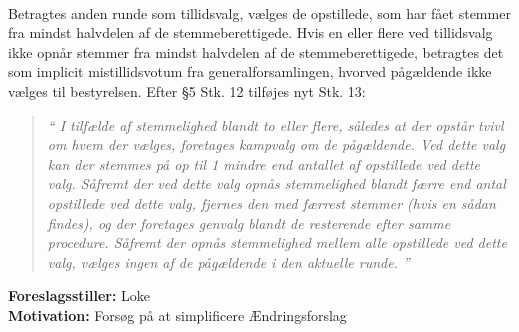 \documentclass[a4paper,12pt,danish]{article}
\newcommand\cit[1]{
    \begin{quote}
        \textit{``#1''}
    \end{quote}
}
\newcommand\who[1]{
    \textbf{Foreslagsstiller:} #1\\
}
\newcommand\why[1]{
    \textbf{Motivation:} #1\\
}
\begin{document}
{{{            \\
            Betragtes anden runde som tillidsvalg, vælges de opstillede, som har fået stemmer fra mindst halvdelen af de stemmeberettigede. Hvis en eller flere ved tillidsvalg ikke opnår stemmer fra mindst halvdelen af de stemmeberettigede, betragtes det som implicit mistillidsvotum fra generalforsamlingen, hvorved pågældende ikke vælges til bestyrelsen.
        }
        Efter \S5 Stk. 12 tilføjes nyt Stk. 13:
        \cit{
            I tilfælde af stemmelighed blandt to eller flere, således at der opstår tvivl om hvem der vælges, foretages kampvalg om de pågældende. Ved dette valg kan der stemmes på op til 1 mindre end antallet af opstillede ved dette valg. Såfremt der ved dette valg opnås stemmelighed blandt færre end antal opstillede ved dette valg, fjernes den med færrest stemmer (hvis en sådan findes), og der foretages genvalg blandt de resterende efter samme procedure. Såfremt der opnås stemmelighed mellem alle opstillede ved dette valg, vælges ingen af de pågældende i den aktuelle runde.
        }
        \who{Loke}
        \why{Forsøg på at simplificere Ændringsforslag }
    }
}
\end{document}
